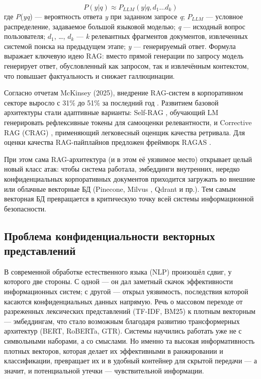 \documentclass[a4paper, 12pt, oneside, openany]{article}
\begin{document}
\begin{equation}
	P\left( y|q \right) \approx P_{LLM}\left( y|q,d_{1}\ldots d_{k} \right)
	\label{eq:1-5}
\end{equation}
где \emph{P}(\emph{y}\textbar{}\emph{q}) --- вероятность ответа \emph{y} при заданном запросе \emph{q}; \(P_{LLM}\) --- условное распределение, задаваемое большой языковой моделью; \emph{q} --- исходный вопрос пользователя; $d_1$, \ldots, $d_k$ --- \emph{k} релевантных фрагментов документов, извлеченных системой поиска на предыдущем этапе; \emph{y} --- генерируемый ответ. Формула выражает ключевую идею RAG: вместо прямой генерации по запросу модель генерирует ответ, обусловленный как запросом, так и извлечённым контекстом, что повышает фактуальность и снижает галлюцинации.

Согласно отчетам McKinsey (2025), внедрение RAG-систем в корпоративном секторе выросло с 31\% до 51\% за последний год \cite{ref20}. Развитием базовой архитектуры стали адаптивные варианты: Self-RAG \cite{ref36}, обучающий LM генерировать рефлексивные токены для самооценки релевантности, и Corrective RAG (CRAG) \cite{ref37}, применяющий легковесный оценщик качества ретривала. Для оценки качества RAG-пайплайнов предложен фреймворк RAGAS \cite{ref38}.

При этом сама RAG-архитектура (и в этом её уязвимое место) открывает целый новый класс атак: чтобы система работала, эмбеддинги внутренних, нередко конфиденциальных корпоративных документов приходится загружать во внешние или облачные векторные БД (Pinecone, Milvus \cite{ref33}, Qdrant и пр.). Тем самым векторная БД превращается в критическую точку всей системы информационной безопасности.

\subsection{Проблема конфиденциальности векторных представлений}

В современной обработке естественного языка (NLP) произошёл сдвиг, у которого две стороны. С одной — он дал заметный скачок эффективности информационных систем; с другой — открыл уязвимость, последствия которой касаются конфиденциальных данных напрямую. Речь о массовом переходе от разреженных лексических представлений (TF-IDF, BM25) к плотным векторным — эмбеддингам, что стало возможным благодаря развитию трансформерных архитектур (BERT, RoBERTa, GTR). Системы научились работать уже не с символьными наборами, а со смыслами. Но именно та высокая информативность плотных векторов, которая делает их эффективными в ранжировании и классификации, превращает их и в удобный контейнер для скрытой передачи — а значит, и потенциальной утечки — чувствительной информации.
\end{document}
